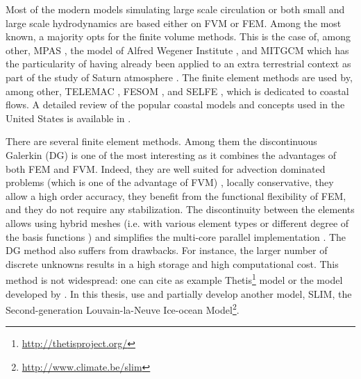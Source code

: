 Most of the modern models simulating large scale circulation or both small and large scale hydrodynamics are based either on FVM or FEM. Among the most known, a majority opts for the finite volume methods. This is the case of, among other, MPAS \citep[Model for Precision Across Scales\footnote{\url{https://mpas-dev.github.io,}}][]{ringler2013multi}, the model of Alfred Wegener Institute \citep{danilov2012two}, and MITGCM \citep[MIT General Circulation Model\footnote{\url{http://mitgcm.org}},][]{marshall1997finite} which has the particularity of having already been applied to an extra terrestrial context as part of the study of Saturn atmosphere \citep{afanasyev2018cyclonic}. The finite element methods are used by, among other, TELEMAC \citep[open TELEMAC-MASCARET\footnote{\url{http://www.opentelemac.org}},][]{hervouet2007hydrodynamics}, FESOM \citep[Finite Element Sea Ice-Ocean Model\footnote{\url{https://fesom.de},}][]{wang2008finite}, and SELFE \citep[Semi-implicit Eulerian-Lagrangian Finite Element\footnote{\url{http://www.stccmop.org/knowledge_transfer/software/selfe}},][]{zhang2008selfe}, which is dedicated to coastal flows. A detailed review of the popular coastal models and concepts used in the United States is available in \cite{fringer2019future}.

There are several finite element methods. Among them the discontinuous Galerkin (DG) is one of the most interesting as it combines the advantages of both FEM and FVM. Indeed, they are well suited for advection dominated problems (which is one of the advantage of FVM) \citep{bernard2007high}, locally conservative, they allow a high order accuracy, they benefit from the functional flexibility of FEM, and they do not require any stabilization. The discontinuity between the elements allows using hybrid meshes (i.e. with various element types or different degree of the basis functions \citep{karna2012Thesis}) and simplifies the multi-core parallel implementation \citep{seny2013multirate,seny2014efficient}. The DG method also suffers from drawbacks. For instance, the larger number of discrete unknowns results in a high storage and high computational cost. This method is not widespread: one can cite as example Thetis\footnote{\url{http://thetisproject.org/}} model \citep{karna2018thetis} or the model developed by \citet{conroy2016hp}. In this thesis, 
use and partially develop another model, SLIM, the Second-generation Louvain-la-Neuve Ice-ocean Model\footnote{\url{http://www.climate.be/slim}}.

